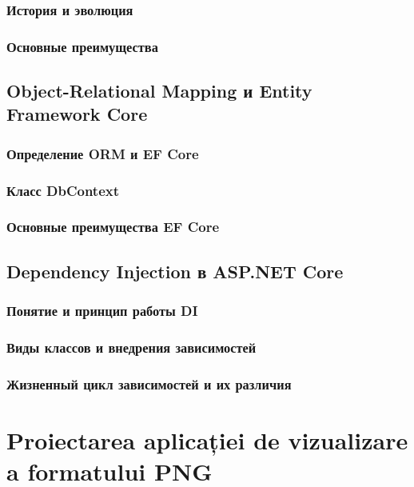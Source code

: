 \documentclass[a4paper,12pt]{report}
\begin{document}
\subsection{История и эволюция}

\subsection{Основные преимущества}

\section{Object-Relational Mapping и Entity Framework Core}

\subsection{Определение \ac{ORM} и \ac{EF} Core}

\subsection{Класс DbContext}

\subsection{Основные преимущества \ac{EF} Core}

\section{Dependency Injection в ASP.NET Core}

\subsection{Понятие и принцип работы \ac{DI}}

\subsection{Виды классов и внедрения зависимостей}

\subsection{Жизненный цикл зависимостей и их различия}


\chapter{Proiectarea aplicației de vizualizare a formatului \acs{PNG}}\label{architecture_chapter_title}
\end{document}
